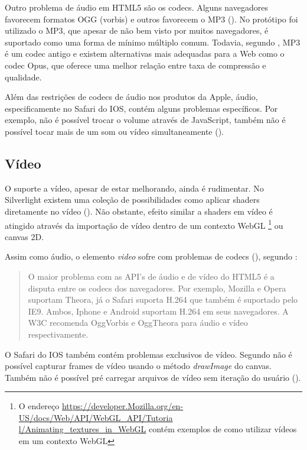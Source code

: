 Outro problema de áudio em HTML5 são os codecs. Alguns
navegadores favorecem formatos OGG (vorbis) e outros favorecem o
MP3 ().
No protótipo foi utilizado o MP3, que apesar de não bem visto por
muitos navegadores, é suportado como uma forma de mínimo múltiplo
comum. Todavia, segundo \citet{opus}, MP3 é um codec antigo e existem
alternativas mais adequadas para a Web como o codec Opus, que oferece
uma melhor relação entre taxa de compressão e qualidade.

Além das restrições de codecs de áudio nos produtos da Apple,
áudio, especificamente no Safari do IOS, contém alguns problemas
específicos. Por exemplo, não é possível trocar o volume
através de JavaScript, também não é possível tocar mais de um
som ou vídeo simultaneamente \autocite{unsolvedMediaHtmlIssues}
().

\subsection{Vídeo}

O suporte a vídeo, apesar de estar melhorando, ainda é rudimentar.
No Silverlight existem uma coleção de possibilidades como aplicar
shaders diretamente no vídeo \autocite[p. 8]{researchOnHtml}
(). Não obstante, efeito similar
a shaders em vídeo é atingido através da importação de
vídeo dentro de um contexto WebGL \footnote{O endereço
\url{https://developer.Mozilla.org/en-US/docs/Web/API/WebGL_API/Tutoria
l/Animating_textures_in_WebGL} contém exemplos de como utilizar vídeos
em um contexto WebGL} ou canvas 2D.

Assim como áudio, o elemento \textit{video} sofre com problemas de
codecs (), segundo \citet{html5Tradeoffs}:
\begin{quote}
O maior problema com as API's de áudio e de vídeo do HTML5 é
a disputa entre os codecs dos navegadores. Por exemplo, Mozilla e
Opera suportam Theora, já o Safari suporta H.264 que também é
suportado pelo IE9. Ambos, Iphone e Android suportam H.264 em seus
navegadores. A W3C recomenda OggVorbis e OggTheora para áudio e vídeo
respectivamente.
\end{quote}

O Safari do IOS também contém problemas exclusivos de vídeo. Segundo
\citet{unsolvedMediaHtmlIssues} não é possível capturar frames de
vídeo usando o método \textit{drawImage} do canvas. Também não é
possível pré carregar arquivos de vídeo sem iteração do usuário
().


